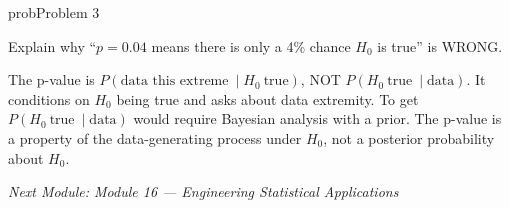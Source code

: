 \begin{PSbox}[unbreakable]{prob}{Problem 3}

Explain why ``$p = 0.04$ means there is only a 4\% chance $H_{0}$ is true'' is WRONG.

\PSsolution{} The p-value is $P(\text{data this extreme}\ \mid H_{0}\ \text{true})$, NOT $P(H_{0}\ \text{true}\ \mid \text{data})$. It conditions on $H_{0}$ being true and asks about data extremity. To get $P(H_{0}\ \text{true}\ \mid \text{data})$ would require Bayesian analysis with a prior. The p-value is a property of the data-generating process under $H_{0}$, not a posterior probability about $H_{0}$.

\emph{Next Module: {Module 16 — Engineering Statistical Applications}}

\end{PSbox}
